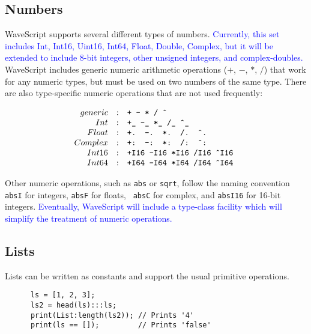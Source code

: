\documentclass[twocolumn]{report}
\newcommand{\rednote}[1]{{\textcolor{blue}{#1}}}
\newcommand{\ws}{WaveScript}
\begin{document}
\subsection{Numbers}

WaveScript supports several different types of numbers.  \rednote{Currently,
this set includes Int, Int16, Uint16, Int64, Float, Double, Complex, but it will be extended
to include 8-bit integers, other unsigned integers, and complex-doubles.}
WaveScript includes generic numeric arithmetic operations ($+$, $-$,
$*$, $/$) that work for any numeric types, but must be used on two
numbers of the same type.  There are also type-specific numeric
operations that are not used frequently:

\[
\begin{array}{rcl}
generic          & : & $\tt + - * / \^{}$   \\
Int              & : & $\tt +\_ -\_ *\_ /\_ \^{}\_ $ \\
Float            & : & $\tt +. -. *. /. \^{}. $ \\
Complex          & : & $\tt +: -: *: /: \^{}: $ \\
Int16            & : & $\tt +I16 -I16 *I16 /I16 \^{}I16 $   \\
Int64            & : & $\tt +I64 -I64 *I64 /I64 \^{}I64 $   \\
\end{array}
\]

Other numeric operations, such as {\tt abs} or {\tt sqrt}, follow the
naming convention {\tt absI} for integers, {\tt absF} for floats, {\tt
absC} for complex, and {\tt absI16} for 16-bit integers.
\rednote{Eventually, {\ws} will include a type-class facility which
  will simplify the treatment of numeric operations.}



\subsection{Lists}

Lists can be written as constants and support the usual primitive
operations.  
\begin{verbatim}
      ls = [1, 2, 3];
      ls2 = head(ls):::ls;
      print(List:length(ls2)); // Prints '4'
      print(ls == []);         // Prints 'false'
\end{verbatim}
\end{document}

